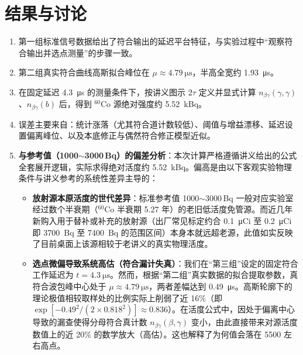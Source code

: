 \documentclass[12pt,a4paper]{article}
\begin{document}
\section{结果与讨论}
\begin{enumerate}
    \item 第一组标准信号数据给出了符合输出的延迟平台特征，与实验过程中“观察符合输出并选点测量”的步骤一致。
    \item 第二组真实符合曲线高斯拟合峰位在 $\mu\approx\SI{4.79}{\micro\second}$，半高全宽约 \SI{1.93}{\micro\second}。
    \item 在固定延迟 \SI{4.3}{\micro\second} 的测量条件下，按讲义图示 $2\tau$ 定义并显式计算 $n_{\beta\gamma}(\gamma,\gamma)$、$n_{\beta\gamma}(b)$ 后，得到 $^{60}\mathrm{Co}$ 源绝对强度约 \SI{5.52}{\kilo\becquerel}。
    \item 误差主要来自：统计涨落（尤其符合道计数较低）、阈值与增益漂移、延迟设置偏离峰位、以及本底修正与偶然符合修正模型近似。
    \item \textbf{与参考值（1000$\sim$3000\,\unit{\becquerel}）的偏差分析}：本次计算严格遵循讲义给出的公式全套展开逻辑，实际求得绝对活度约 \SI{5.52}{\kilo\becquerel}。偏高是由以下客观实验物理条件与讲义参考的系统性差异主导的：
    \begin{itemize}
        \item \textbf{放射源本原活度的世代差异}：标准参考值 1000$\sim$3000\,\unit{\becquerel} 一般对应实验室经过数个半衰期（$^{60}\mathrm{Co}$ 半衰期 5.27 年）的老旧低活度免管源。而近几年新购入用于替补或补充的放射源（出厂常见标定约合 \qty{0.1}{\micro Ci} 至 \qty{0.2}{\micro Ci} 即 \qty{3700}{\becquerel} 至 \qty{7400}{\becquerel} 的范围区间）本身本就远超老源，此值如实反映了目前桌面上该源相较于老讲义的真实物理活度。
        \item \textbf{选点微偏导致系统高估（符合漏计失真）}：我们在“第三组”设定的固定符合工作延迟为 $t=\SI{4.3}{\micro\second}$。然而，根据“第二组”真实数据的拟合提取参数，真符合波包峰中心处于 $\mu\approx\SI{4.79}{\micro\second}$，两者差幅达到 \SI{0.49}{\micro\second}。高斯轮廓下的理论极值相较取样处的比例实际上削弱了近 16\%（即 $\exp\!\left[-0.49^2 / (2\times 0.818^2)\right] \approx 0.836$）。在活度公式中，因处于偏离中心导致的漏查使得分母符合真计数 $n_{\beta\gamma}(\beta,\gamma)$ 变小，由此直接带来对源活度数值上的近 20\% 的数学放大（高估）。这也解释了为何值会落在 5500 左右高点。
    \end{itemize}
\end{enumerate}
\end{document}

